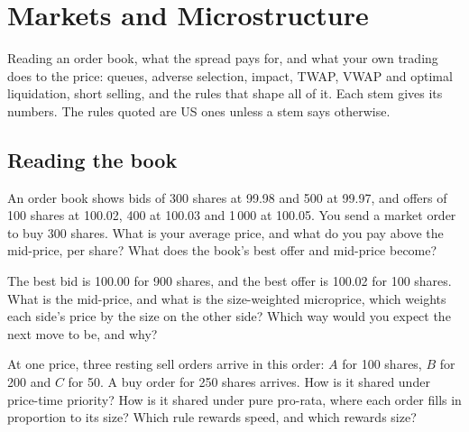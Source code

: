 \chapter{Markets and Microstructure}\label{ch:iv2:markets-and-microstructure}

\begin{ivtrains}
Reading an order book, what the spread pays for, and what your own trading does to the price: queues, adverse selection, impact, TWAP, VWAP and optimal liquidation, short selling, and the rules that shape all of it. Each stem gives its numbers. The rules quoted are US ones unless a stem says otherwise.
\end{ivtrains}

\section{Reading the book}

\begin{question}\label{iq:iv2:markets-and-microstructure:1}
An order book shows bids of 300 shares at 99.98 and 500 at 99.97, and offers of 100 shares at 100.02, 400 at 100.03 and 1\,000 at 100.05. You send a market order to buy 300 shares. What is your average price, and what do you pay above the mid-price, per share? What does the book's best offer and mid-price become?
\end{question}

\begin{question}\label{iq:iv2:markets-and-microstructure:2}
The best bid is 100.00 for 900 shares, and the best offer is 100.02 for 100 shares. What is the mid-price, and what is the size-weighted microprice, which weights each side's price by the size on the other side? Which way would you expect the next move to be, and why?
\end{question}

\begin{question}\label{iq:iv2:markets-and-microstructure:3}
At one price, three resting sell orders arrive in this order: $A$ for 100 shares, $B$ for 200 and $C$ for 50. A buy order for 250 shares arrives. How is it shared under price-time priority? How is it shared under pure pro-rata, where each order fills in proportion to its size? Which rule rewards speed, and which rewards size?
\end{question}


